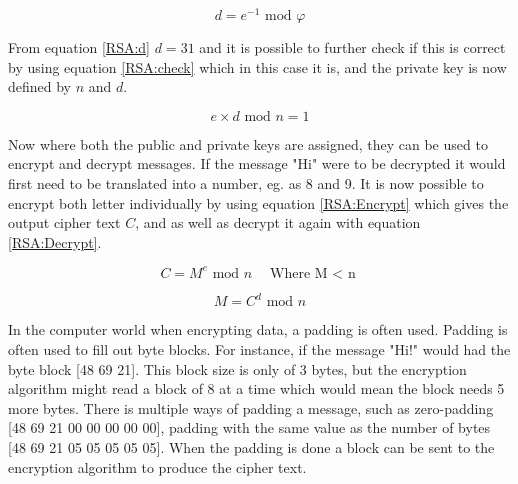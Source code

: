 \begin{equation}
d = e^{-1} \textrm{ mod } \varphi
\label{RSA:d}
\end{equation}

From equation \ref{RSA:d} $d=31$ and it is possible to further check if this is correct by using equation \ref{RSA:check} which in this case it is, and the private key is now defined by $n$ and $d$.

\begin{equation}
e \times d \textrm{ mod } n = 1
\label{RSA:check}
\end{equation}

Now where both the public and private keys are assigned, they can be used to encrypt and decrypt messages. If the message "Hi" were to be decrypted it would first need to be translated into a number, eg. as 8 and 9. It is now possible to encrypt both letter individually by using equation \ref{RSA:Encrypt} which gives the output cipher text $C$, and as well as decrypt it again with equation \ref{RSA:Decrypt}.

\begin{equation}
C=M^e \textrm{ mod } n \quad \textrm{Where M $<$ n}
\label{RSA:Encrypt}
\end{equation}

\begin{equation}
M=C^d \textrm{ mod } n
\label{RSA:Decrypt}
\end{equation}

In the computer world when encrypting data, a padding is often used. Padding is often used to fill out byte blocks. For instance, if the message "Hi!" would had the byte block [48 69 21]. This block size is only of 3 bytes, but the encryption algorithm might read a block of 8 at a time which would mean the block needs 5 more bytes. There is multiple ways of padding a message, such as zero-padding [48 69 21 00 00 00 00 00], padding with the same value as the number of bytes [48 69 21 05 05 05 05 05]\cite{PADDING}. When the padding is done a block can be sent to the encryption algorithm to produce the cipher text.